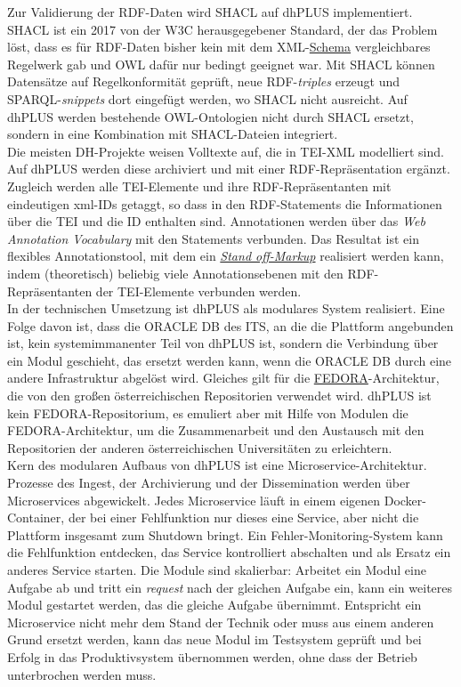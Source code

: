\documentclass{article}
\begin{document}
        Zur Validierung der RDF-Daten wird SHACL auf dhPLUS implementiert. SHACL ist ein 2017 von der W3C herausgegebener Standard, der das Problem löst, dass es für RDF-Daten bisher kein mit dem XML-\href{http://gams.uni-graz.at/o:konde.166}{Schema} vergleichbares Regelwerk gab und OWL dafür nur bedingt geeignet war. Mit SHACL können Datensätze auf Regelkonformität geprüft, neue RDF-\emph{triples} erzeugt und SPARQL-\emph{snippets} dort eingefügt werden, wo SHACL nicht ausreicht. Auf dhPLUS werden bestehende OWL-Ontologien nicht durch SHACL ersetzt, sondern in eine Kombination mit SHACL-Dateien integriert.\\
            
        Die meisten DH-Projekte weisen Volltexte auf, die in TEI-XML modelliert sind. Auf dhPLUS werden diese archiviert und mit einer RDF-Repräsentation ergänzt. Zugleich werden alle TEI-Elemente und ihre RDF-Repräsentanten mit eindeutigen xml-IDs getaggt, so dass in den RDF-Statements die Informationen über die TEI und die ID enthalten sind. Annotationen werden über das \emph{Web Annotation Vocabulary} mit den Statements verbunden. Das Resultat ist ein flexibles Annotationstool, mit dem ein \emph{\href{http://gams.uni-graz.at/o:konde.171}{Stand off-Markup}} realisiert werden kann, indem (theoretisch) beliebig viele Annotationsebenen mit den RDF-Repräsentanten der TEI-Elemente verbunden werden.\\
            
        In der technischen Umsetzung ist dhPLUS als modulares System realisiert. Eine Folge davon ist, dass die ORACLE DB des ITS, an die die Plattform angebunden ist, kein systemimmanenter Teil von dhPLUS ist, sondern die Verbindung über ein Modul geschieht, das ersetzt werden kann, wenn die ORACLE DB durch eine andere Infrastruktur abgelöst wird. Gleiches gilt für die \href{http://gams.uni-graz.at/o:konde.69}{FEDORA}-Architektur, die von den großen österreichischen Repositorien verwendet wird. dhPLUS ist kein FEDORA-Repositorium, es emuliert aber mit Hilfe von Modulen die FEDORA-Architektur, um die Zusammenarbeit und den Austausch mit den Repositorien der anderen österreichischen Universitäten zu erleichtern.\\
            
        Kern des modularen Aufbaus von dhPLUS ist eine Microservice-Architektur. Prozesse des Ingest, der Archivierung und der Dissemination werden über Microservices abgewickelt. Jedes Microservice läuft in einem eigenen Docker-Container, der bei einer Fehlfunktion nur dieses eine Service, aber nicht die Plattform insgesamt zum Shutdown bringt. Ein Fehler-Monitoring-System kann die Fehlfunktion entdecken, das Service kontrolliert abschalten und als Ersatz ein anderes Service starten. Die Module sind skalierbar: Arbeitet ein Modul eine Aufgabe ab und tritt ein \emph{request} nach der gleichen Aufgabe ein, kann ein weiteres Modul gestartet werden, das die gleiche Aufgabe übernimmt. Entspricht ein Microservice nicht mehr dem Stand der Technik oder muss aus einem anderen Grund ersetzt werden, kann das neue Modul im Testsystem geprüft und bei Erfolg in das Produktivsystem übernommen werden, ohne dass der Betrieb unterbrochen werden muss.\\
            
\end{document}
